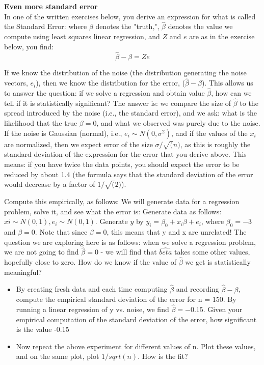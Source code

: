 \documentclass[12pt]{article}%
\begin{document}
\textbf{Even more standard error}\\

In one of the written exercises below, you derive an expression for what is called the Standard Error: where $\beta$ denotes the "truth,", $\hat{\beta}$ denotes the value we compute using least squares linear regression, and $Z$ and $e$ are as in the exercise below, you find:
\begin{equation*}
    \hat{\beta} - \beta = Ze
\end{equation*}

If we know the distribution of the noise (the distribution generating the noise vectors, $e_i$), then we know the distribution for the error, ($\hat{\beta} - \beta$). This allows us to answer the question: if we solve a regression and obtain value $\hat{\beta}$, how can we tell if it is statistically significant? The answer is: we compare the size of $\hat{\beta}$ to the spread introduced by the noise (i.e., the standard error), and we ask: what is the likelihood that the true $\beta = 0$, and what we observed was purely due to the noise.\\

If the noise is Gaussian (normal), i.e., $e_i \sim N(0, \sigma^2)$, and if the values of the $x_i$ are normalized, then we expect error of the size $\sigma/\sqrt(n)$, as this is roughly the standard deviation of the expression for the error that you derive above. This means: if you have twice the data points, you should expect the error to be reduced by about 1.4 (the formula says that the standard deviation of the error would decrease by a factor of $1/\sqrt(2)$).

Compute this empirically, as follows: We will generate data for a regression problem, solve it, and see what the error is: Generate data as follows: $xi \sim N(0, 1), e_i \sim N(0, 1)$. Generate $y$ by $y_i = \beta_0 + x_i\beta + e_i$, where $\beta_0 = -3$ and $\beta = 0$. Note that since $\beta = 0$, this means that y and x are unrelated! The question we are exploring here is as follows: when we solve a regression problem, we are not going to find $\hat{\beta} = 0$ - we will find that $\hat{beta}$ takes some other values, hopefully close to zero. How do we know if the value of $\hat{\beta}$ we get is statistically meaningful?
\begin{itemize}
    \item By creating fresh data and each time computing $\hat{\beta}$ and recording $\hat{\beta} - \beta$, compute the empirical standard deviation of the error for n = 150. By running a linear regression of y vs. noise, we find $\hat{\beta} = -0.15$. Given your empirical computation of the standard deviation of the error, how significant is the value -0.15
    \item Now repeat the above experiment for different values of n. Plot these values, and on the same plot, plot $1/sqrt(n)$. How is the fit?
\end{itemize}
\end{document}
